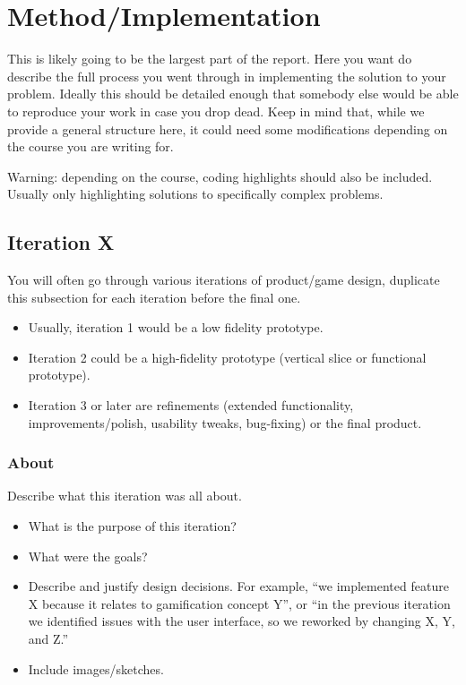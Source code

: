 \documentclass[conference]{IEEEtran}
\begin{document}
\section{Method/Implementation}

This is likely going to be the largest part of the report. Here you want do describe the full process you went through in implementing the solution to your problem. Ideally this should be detailed enough that somebody else would be able to reproduce your work in case you drop dead. Keep in mind that, while we provide a general structure here, it could need some modifications depending on the course you are writing for.

\begin{displayquote}
{\color{red}
Warning: depending on the course, coding highlights should also be included. Usually only highlighting solutions to specifically complex problems.
}
\end{displayquote}

\subsection{Iteration X}

You will often go through various iterations of product/game design, duplicate this subsection for each iteration before the final one. 

\begin{itemize}
	\item Usually, iteration 1 would be a low fidelity prototype.
	\item Iteration 2 could be a high-fidelity prototype (vertical slice or functional prototype).
	\item Iteration 3 or later are refinements (extended functionality, improvements/polish, usability tweaks, bug-fixing) or the final product.
\end{itemize}

\subsubsection{About}

Describe what this iteration was all about.

\begin{itemize}
	\item What is the purpose of this iteration?
	\item What were the goals?
	\item Describe and justify design decisions. For example, “we implemented feature X because it relates to gamification concept Y”, or “in the previous iteration we identified issues with the user interface, so we reworked by changing X, Y, and Z.”
	\item Include images/sketches. 
\end{itemize}
\end{document}
